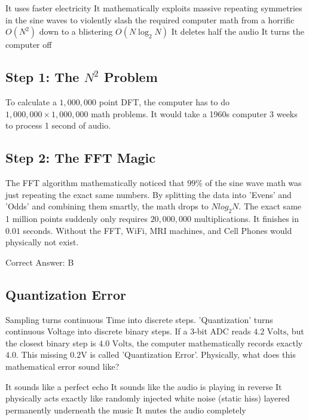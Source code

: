 \begin{choices}
    \choice It uses faster electricity
    \correctchoice It mathematically exploits massive repeating symmetries in the sine waves to violently slash the required computer math from a horrific $O(N^2)$ down to a blistering $O(N \log_2 N)$
    \choice It deletes half the audio
    \choice It turns the computer off
\end{choices}

\begin{solution}

\subsection*{Step 1: The $N^2$ Problem}
To calculate a $1,000,000$ point DFT, the computer has to do $1,000,000 \times 1,000,000$ math problems. It would take a 1960s computer 3 weeks to process 1 second of audio.

\subsection*{Step 2: The FFT Magic}
The FFT algorithm mathematically noticed that $99\%$ of the sine wave math was just repeating the exact same numbers. By splitting the data into 'Evens' and 'Odds' and combining them smartly, the math drops to $N log_2 N$. The exact same 1 million points suddenly only requires $20,000,000$ multiplications. It finishes in $0.01$ seconds. Without the FFT, WiFi, MRI machines, and Cell Phones would physically not exist.

Correct Answer: B
\end{solution}

\clearpage

\subsection{Quantization Error}

Sampling turns continuous Time into discrete steps. 'Quantization' turns continuous Voltage into discrete binary steps. If a 3-bit ADC reads $4.2\text{ Volts}$, but the closest binary step is $4.0\text{ Volts}$, the computer mathematically records exactly $4.0$. This missing $0.2\text{V}$ is called 'Quantization Error'. Physically, what does this mathematical error sound like?

\begin{choices}
    \choice It sounds like a perfect echo
    \choice It sounds like the audio is playing in reverse
    \correctchoice It physically acts exactly like randomly injected white noise (static hiss) layered permanently underneath the music
    \choice It mutes the audio completely
\end{choices}

